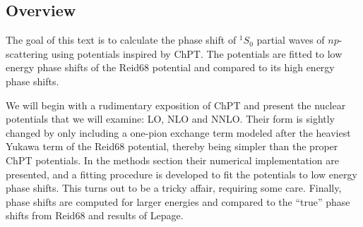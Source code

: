 \subsection{Overview}
The goal of this text is to calculate the phase shift of \(^{1}S_{0}\) partial
waves of \(np\)-scattering using potentials inspired by ChPT. The potentials
are fitted to low energy phase shifts of the Reid68 potential and compared to
its high energy phase shifts.

We will begin with a rudimentary exposition of ChPT and present the nuclear
potentials that we will examine: LO, NLO and NNLO. Their form is sightly changed
by only including a one-pion exchange term modeled after the heaviest Yukawa
term of the Reid68 potential, thereby being simpler than the proper ChPT
potentials. In the methods section their numerical implementation are 
presented, and a fitting procedure is developed to fit the potentials to low
energy phase shifts. This turns out to be a tricky affair, requiring some care. Finally, phase shifts
are computed for larger energies and compared to the ``true'' phase shifts from
Reid68 and results of Lepage.


